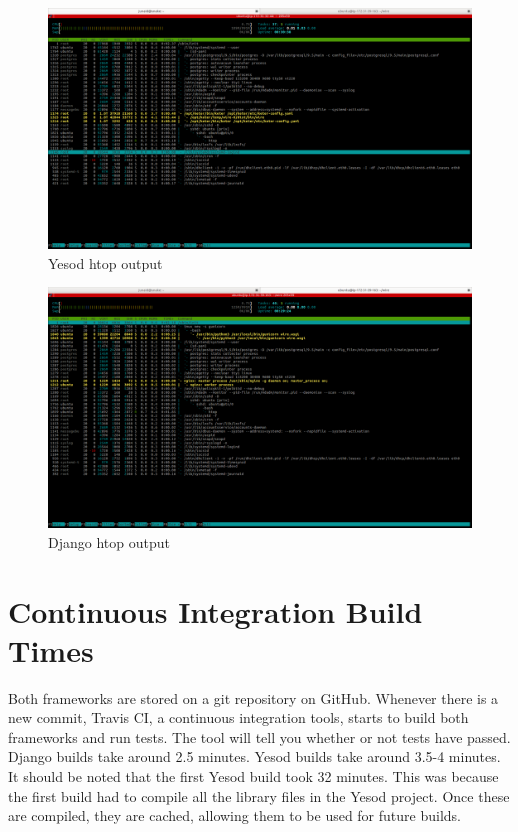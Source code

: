 \begin{figure}[H]
	\centering
	\includegraphics[width=1\textwidth]{final_report/pics/yesodIdle.png}
	\caption{Yesod htop output}
	\label{fig:yesodHtop}
\end{figure}

\begin{figure}[H]
	\centering
	\includegraphics[width=1\textwidth]{final_report/pics/djangoIdle.png}
	\caption{Django htop output}
	\label{fig:djangoHtop}
\end{figure}

\section{Continuous Integration Build Times}

Both frameworks are stored on a git repository on GitHub. Whenever there is a
new commit, Travis CI, a continuous integration tools, starts to build
both frameworks and run tests. The tool will tell you whether or not tests
have passed. Django builds take around 2.5 minutes. Yesod builds take around
3.5-4 minutes. It should be noted that the first Yesod build took 32 minutes.
This was because the first build had to compile all the library files in the
Yesod project. Once these are compiled, they are cached, allowing them to
be used for future builds.

